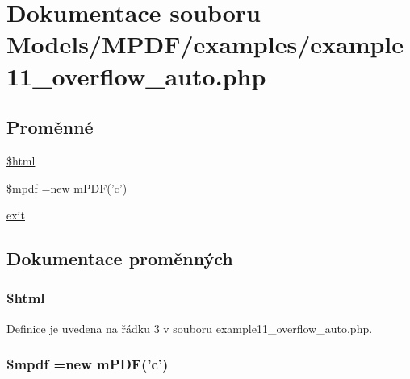 \hypertarget{example11__overflow__auto_8php}{\section{Dokumentace souboru Models/\-M\-P\-D\-F/examples/example11\-\_\-overflow\-\_\-auto.php}
\label{example11__overflow__auto_8php}
}
\subsection*{Proměnné}
\begin{DoxyCompactItemize}
\item 
\hyperlink{example11__overflow__auto_8php_a6f96e7fc92441776c9d1cd3386663b40}{\$html}
\item 
\hyperlink{example11__overflow__auto_8php_ad028f81910d6cbab9b184d2214b3a8f8}{\$mpdf} =new \hyperlink{classm_p_d_f}{m\-P\-D\-F}('c')
\item 
\hyperlink{example11__overflow__auto_8php_a6733eb5f605d09eaede9845835d71c4e}{exit}
\end{DoxyCompactItemize}


\subsection{Dokumentace proměnných}
\hypertarget{example11__overflow__auto_8php_a6f96e7fc92441776c9d1cd3386663b40}{
\subsubsection[{\$html}]{\setlength{\rightskip}{0pt plus 5cm}\$html}}\label{example11__overflow__auto_8php_a6f96e7fc92441776c9d1cd3386663b40}


Definice je uvedena na řádku 3 v souboru example11\-\_\-overflow\-\_\-auto.\-php.

\hypertarget{example11__overflow__auto_8php_ad028f81910d6cbab9b184d2214b3a8f8}{
\subsubsection[{\$mpdf}]{\setlength{\rightskip}{0pt plus 5cm}\$mpdf =new {\bf m\-P\-D\-F}('c')}}\label{example11__overflow__auto_8php_ad028f81910d6cbab9b184d2214b3a8f8}


